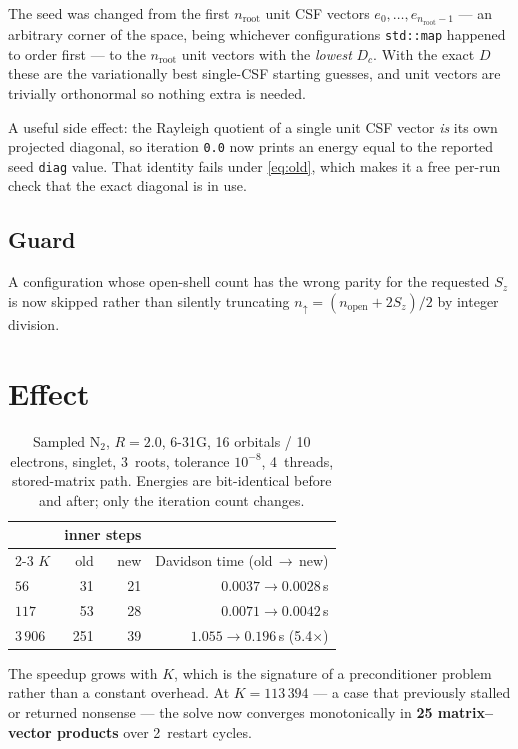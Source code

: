 \documentclass[11pt,a4paper]{article}
\newcommand{\code}[1]{\texttt{\small #1}}
\begin{document}
The seed was changed from the first $n_{\text{root}}$ unit CSF vectors
$e_0,\dots,e_{n_{\text{root}}-1}$ --- an arbitrary corner of the space, being
whichever configurations \code{std::map} happened to order first --- to the
$n_{\text{root}}$ unit vectors with the \emph{lowest} $D_c$. With the exact
$D$ these are the variationally best single-CSF starting guesses, and unit
vectors are trivially orthonormal so nothing extra is needed.

A useful side effect: the Rayleigh quotient of a single unit CSF vector
\emph{is} its own projected diagonal, so iteration \code{0.0} now prints an
energy equal to the reported seed \code{diag} value. That identity fails under
\eqref{eq:old}, which makes it a free per-run check that the exact diagonal is
in use.

\subsection*{Guard}

A configuration whose open-shell count has the wrong parity for the requested
$S_z$ is now skipped rather than silently truncating
$n_\uparrow = (n_{\text{open}} + 2S_z)/2$ by integer division.

\section{Effect}

\begin{table}[h]
\centering
\caption{Sampled N$_2$, $R=2.0$, 6-31G, 16 orbitals / 10 electrons, singlet,
3~roots, tolerance $10^{-8}$, 4~threads, stored-matrix path. Energies are
bit-identical before and after; only the iteration count changes.}
\label{tab:speed}
\begin{tabular}{lrrr}
\toprule
 & \multicolumn{2}{c}{inner steps} & \\
\cmidrule(lr){2-3}
$K$ & old & new & Davidson time (old\,$\to$\,new) \\
\midrule
$56$    & 31  & 21 & $0.0037 \to 0.0028$\,s \\
$117$   & 53  & 28 & $0.0071 \to 0.0042$\,s \\
$3\,906$ & 251 & 39 & $1.055 \to 0.196$\,s \quad(5.4$\times$) \\
\bottomrule
\end{tabular}
\end{table}

The speedup grows with $K$, which is the signature of a preconditioner problem
rather than a constant overhead. At $K=113\,394$ --- a case that previously
stalled or returned nonsense --- the solve now converges monotonically in
\textbf{25 matrix--vector products} over 2~restart cycles.
\end{document}
